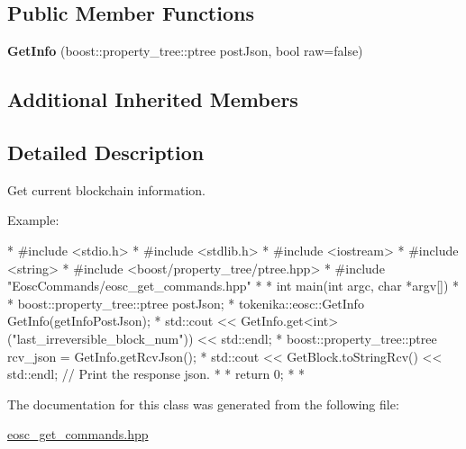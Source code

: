 \subsection*{Public Member Functions}
\begin{DoxyCompactItemize}
\item 
\mbox{\label{classtokenika_1_1eosc_1_1_get_info_a3b219ff2f0036acbecf97922e28c3793}} 
{\bfseries Get\+Info} (boost\+::property\+\_\+tree\+::ptree post\+Json, bool raw=false)
\end{DoxyCompactItemize}
\subsection*{Additional Inherited Members}


\subsection{Detailed Description}
Get current blockchain information. 

Example\+:

\begin{DoxyVerb}* #include <stdio.h>
* #include <stdlib.h>
* #include <iostream>
* #include <string>
* #include <boost/property_tree/ptree.hpp>
* #include "EoscCommands/eosc_get_commands.hpp"
*
* int main(int argc, char *argv[])
* {
* boost::property_tree::ptree postJson;
* tokenika::eosc::GetInfo GetInfo(getInfoPostJson);
* std::cout << GetInfo.get<int>("last_irreversible_block_num")) << std::endl;
* boost::property_tree::ptree rcv_json = GetInfo.getRcvJson();
* std::cout << GetBlock.toStringRcv() << std::endl; // Print the response json.
*
* return 0;
* }
* \end{DoxyVerb}
 

The documentation for this class was generated from the following file\+:\begin{DoxyCompactItemize}
\item 
\hyperlink{eosc__get__commands_8hpp}{eosc\+\_\+get\+\_\+commands.\+hpp}\end{DoxyCompactItemize}
